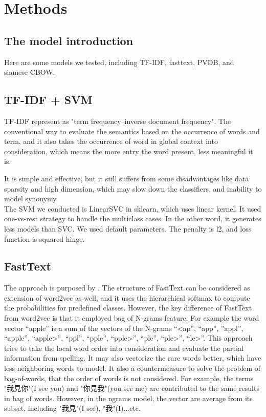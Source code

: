 \chapter{Methods}

\section{The model introduction}

Here are some models we tested, including TF-IDF, fasttext, PVDB, and siamese-CBOW.

\section{TF-IDF + SVM}

	TF-IDF represent as "term frequency–inverse document frequency". The conventional way to evaluate the semantics based on the occurrence of words and term, 
  and it also takes the occurrence of word in global context into consideration, which means the more entry the word present, less meaningful it is.

  It is simple and effective, but it still suffers from some disadvantages like data sparsity and high dimension, which may slow down the classifiers, and inability to model synonymy. \\

  The SVM we conducted is LinearSVC in sklearn, which uses linear kernel. It used one-vs-rest strategy to handle the multiclass cases.
  In the other word, it generates less models than SVC.
  We used default parameters. The penalty is l2, and loss function is squared hinge. 

\section{FastText}
	
The approach is purposed by \cite{joulin2016fasttext}. 
The structure of FastText can be considered as extension of word2vec as well, and it uses the hierarchical softmax to compute the probabilities for predefined classes. 
However, the key difference of FastText from word2vec is that it employed bag of N-grams feature. 
For example the word vector “apple” is a sum of the vectors of the N-grams “<ap”, “app”, ”appl”, “apple”, “apple>”, “ppl”, “pple”, “pple>”, “ple”, “ple>”, “le>”.
This approach tries to take the local word order into consideration and evaluate the partial information from spelling. It may also vectorize the rare words better, which have less neighboring words to model.
It also a countermeasure to solve the problem of bag-of-words, that the order of words is not considered. 
For example, the terms "我見你"(I see you) and "你見我"(you see me) are contributed to the same results in bag of words.
However, in the ngrams model, the vector are average from its subset, including "我見"(I see), "我"(I)...etc.

